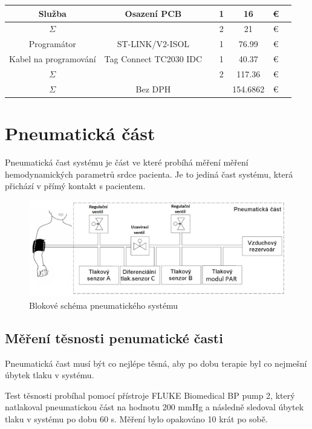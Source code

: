 \begin{table}[H]
\begin{ctucolortab}
\begin{tabular}{ccccccc}
            Služba                & Osazení PCB            &               & 1     & 16       & €        & \\
            \bottomrule
            $\Sigma$              &                        &               & 2     & 21       & €        & \\
            \bottomrule
            Programátor           & ST-LINK/V2-ISOL        &               & 1     & 76.99    & €        & \\
            Kabel na programování & Tag Connect TC2030 IDC &               & 1     & 40.37    & €        & \\
            \bottomrule
            $\Sigma$              &                        &               & 2     & 117.36   & €        & \\
            \bottomrule
            \bottomrule
            $\Sigma$              & Bez DPH                &               &       & 154.6862 & €        & \\
            \bottomrule
        \end{tabular}
    \end{ctucolortab}
\end{table}
\section{Pneumatická část}

Pneumatická čast systému je část ve které probíhá měření měření hemodynamických parametrů srdce pacienta. Je to jediná čast systému, která přichází v přímý kontakt s pacientem.
\begin{figure}[H]
    \includegraphics[width=1\linewidth]{pictures/blokove_schema_pneu.jpg}
    \caption{Blokové schéma pneumatického systému}
    \label{fig:pneu_block}
\end{figure}

\subsection{Měření těsnosti penumatické časti}
Pneumatická čast musí být co nejlépe těsná, aby po dobu terapie byl co nejmešní úbytek tlaku v systému.
\par
Test těsnosti probíhal pomocí přístroje FLUKE Biomedical BP pump 2, který natlakoval pneumatickou část na hodnotu 200 mmHg a následně sledoval úbytek tlaku v systému po dobu 60 s.
Měření bylo opakováno 10 krát po sobě.


